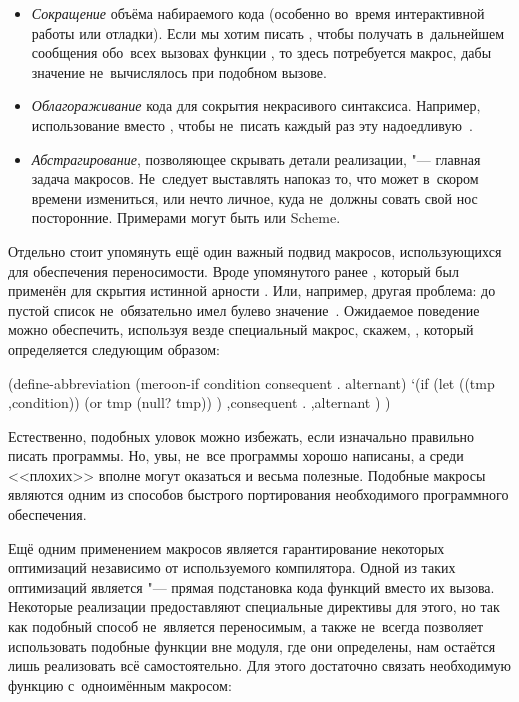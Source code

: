 \begin{itemize}
  \item \emph{Сокращение} объёма набираемого кода (особенно во~время
        интерактивной работы или отладки). Если мы хотим писать , чтобы получать в~дальнейшем сообщения обо~всех вызовах
        функции , то здесь потребуется макрос, дабы значение
         не~вычислялось при подобном вызове.

  \item \emph{Облагораживание} кода для сокрытия некрасивого синтаксиса.
        Например, использование  вместо , чтобы
        не~писать каждый раз эту надоедливую~.

  \item \emph{Абстрагирование}, позволяющее скрывать детали реализации,
        "--- главная задача макросов. Не~следует выставлять напоказ то,
        что может в~скором времени измениться, или нечто личное, куда
        не~должны совать свой нос посторонние. Примерами могут быть
         {\Meroonet} или  Scheme.
\end{itemize}

Отдельно стоит упомянуть ещё один важный подвид макросов, использующихся для
обеспечения переносимости. Вроде упомянутого ранее 
, который был применён для скрытия
истинной арности . Или, например, другая проблема: до \RnRS[4] пустой
список \ic{()} не~обязательно имел булево значение~. Ожидаемое поведение
можно обеспечить, используя везде специальный макрос, скажем, ,
который определяется следующим образом:

\begin{code:lisp}
(define-abbreviation (meroon-if condition consequent . alternant)
  `(if (let ((tmp ,condition))
         (or tmp (null? tmp)) )
      ,consequent . ,alternant ) )
\end{code:lisp}

Естественно, подобных уловок можно избежать, если изначально правильно писать
программы. Но, увы, не~все программы хорошо написаны, а среди <<плохих>> вполне
могут оказаться и весьма полезные. Подобные макросы являются одним из способов
быстрого портирования необходимого программного обеспечения.

Ещё одним применением макросов является гарантирование некоторых оптимизаций
независимо от используемого компилятора. Одной из таких оптимизаций является
 "--- прямая подстановка кода функций вместо их вызова.
Некоторые реализации предоставляют специальные директивы для этого, но так как
подобный способ не~является переносимым, а также не~всегда позволяет
использовать подобные функции вне модуля, где они определены, нам остаётся
лишь реализовать всё самостоятельно. Для этого достаточно связать необходимую
функцию с~одноимённым макросом:

